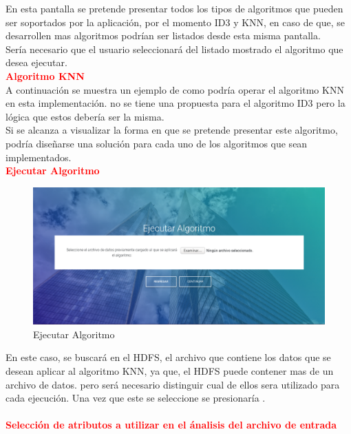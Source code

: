 En esta pantalla se pretende presentar todos los tipos de algoritmos que pueden ser soportados por la aplicación, por el momento ID3 y KNN, en caso de que, se desarrollen mas algoritmos podrían ser listados desde esta misma pantalla.\\
Sería necesario que el usuario seleccionará del listado mostrado el algoritmo que desea ejecutar.\\
\textbf{\textcolor{red}{Algoritmo KNN}}
\\
A continuación se muestra un ejemplo de como podría operar el algoritmo KNN en esta implementación. no se tiene una propuesta para el algoritmo ID3 pero la lógica que estos debería ser la misma.\\
Si se alcanza a visualizar la forma en que se pretende presentar este algoritmo, podría diseñarse una solución para cada uno de los algoritmos que sean implementados.\\
\textbf{\textcolor{red}{Ejecutar Algoritmo}}
\\
\begin{figure}[H]
	\hypertarget{fig:red}{\hspace{1pt}}
	\begin{center}
		\includegraphics[width=1\textwidth]{capitulo7/images/seleccione.png}
		\caption{Ejecutar Algoritmo}
		\label{fig:seleccione}
	\end{center}
\end{figure}
En este caso, se buscará en el HDFS, el archivo que contiene los datos que se desean aplicar al algoritmo KNN, ya que, el HDFS puede contener mas de un archivo de datos. pero será necesario distinguir cual de ellos sera utilizado para cada ejecución. 
Una vez que este se seleccione se presionaría .\\
\\
\newpage
\textbf{\textcolor{red}{Selección de atributos a utilizar en el ánalisis del archivo de entrada}}
